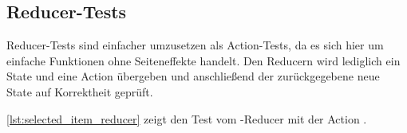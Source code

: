 \subsection{Reducer-Tests}
\label{sec:tf_reducer_tests}

Reducer-Tests sind einfacher umzusetzen als Action-Tests, da es sich hier um
einfache Funktionen ohne Seiteneffekte handelt.  Den Reducern wird lediglich ein
State und eine Action übergeben und anschließend der zurückgegebene neue State
auf Korrektheit geprüft.

\cref{lst:selected_item_reducer} zeigt den Test vom -Reducer
mit der Action .


